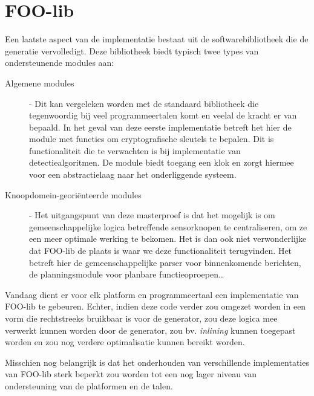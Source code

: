 
\section{FOO-lib}
\label{section:devel-foo-lib}

Een laatste aspect van de implementatie bestaat uit de softwarebibliotheek die
de generatie vervolledigt. Deze bibliotheek biedt typisch twee types van
ondersteunende modules aan:

\begin{description}

\item[Algemene modules] - Dit kan vergeleken worden met de standaard
bibliotheek die tegenwoordig bij veel programmeertalen komt en veelal de kracht
er van bepaald. In het geval van deze eerste implementatie betreft het hier de
 module met functies om cryptografische sleutels te bepalen. Dit is
functionaliteit die te verwachten is bij implementatie van detectiealgoritmen.
De  module biedt toegang een klok en zorgt hiermee voor een
abstractielaag naar het onderliggende systeem.

\item[Knoopdomein-geori\"enteerde modules] - Het uitgangspunt van deze
masterproef is dat het mogelijk is om gemeenschappelijke logica betreffende
sensorknopen te centraliseren, om ze een meer optimale werking te bekomen. Het
is dan ook niet verwonderlijke dat FOO-lib de plaats is waar we deze
functionaliteit terugvinden. Het betreft hier de gemeenschappelijke parser voor
binnenkomende berichten, de planningsmodule voor planbare functieoproepen\dots

\end{description}

Vandaag dient er voor elk platform en programmeertaal een implementatie van
FOO-lib te gebeuren. Echter, indien deze code verder zou omgezet worden in een
vorm die rechtstreeks bruikbaar is voor de generator, zou deze logica mee
verwerkt kunnen worden door de generator, zou bv. \emph{inlining} kunnen
toegepast worden en zou nog verdere optimalisatie kunnen bereikt worden.

Misschien nog belangrijk is dat het onderhouden van verschillende
implementaties van FOO-lib sterk beperkt zou worden tot een nog lager niveau
van ondersteuning van de platformen en de talen.
